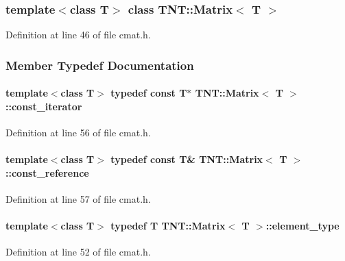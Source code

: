 \subsubsection*{template$<$class T$>$ class TNT::Matrix$<$ T $>$}



Definition at line 46 of file cmat.h.



\subsubsection{Member Typedef Documentation}
\paragraph[{const\_\-iterator}]{\setlength{\rightskip}{0pt plus 5cm}template$<$class T$>$ typedef const T$\ast$ {\bf TNT::Matrix}$<$ T $>$::{\bf const\_\-iterator}}\hfill\label{class_t_n_t_1_1_matrix_a39334142ce0b5ee917e7b222a6b5637b}


Definition at line 56 of file cmat.h.

\paragraph[{const\_\-reference}]{\setlength{\rightskip}{0pt plus 5cm}template$<$class T$>$ typedef const T\& {\bf TNT::Matrix}$<$ T $>$::{\bf const\_\-reference}}\hfill\label{class_t_n_t_1_1_matrix_a6d3ceefbf1675aad4acadac4f78ed04b}


Definition at line 57 of file cmat.h.

\paragraph[{element\_\-type}]{\setlength{\rightskip}{0pt plus 5cm}template$<$class T$>$ typedef T {\bf TNT::Matrix}$<$ T $>$::{\bf element\_\-type}}\hfill\label{class_t_n_t_1_1_matrix_a8ecf0a648bbfaf636fd78c21b35a0a4d}


Definition at line 52 of file cmat.h.

